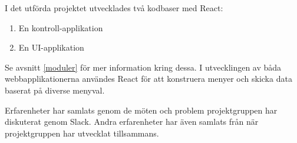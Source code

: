 I det utförda projektet utvecklades två kodbaser med React:

\begin{enumerate}
    \item En kontroll-applikation
    \item En UI-applikation
\end{enumerate} 

Se avsnitt \ref{moduler} för mer information kring dessa. I utvecklingen av båda webbapplikationerna användes React för att konstruera menyer och skicka data baserat på diverse menyval.

Erfarenheter har samlats genom de möten och problem projektgruppen har diskuterat genom Slack. Andra erfarenheter har även samlats från när projektgruppen har utvecklat tillsammans.



